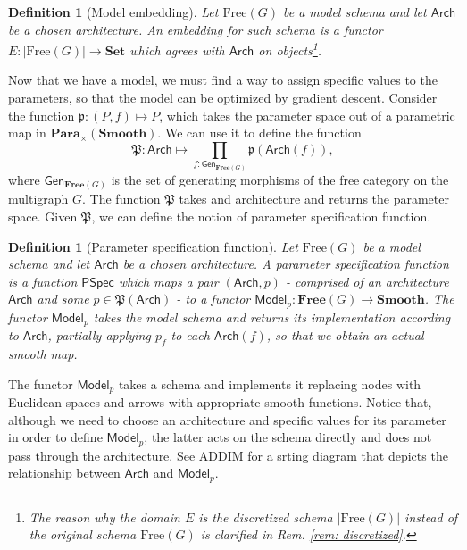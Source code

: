 \documentclass[11pt,a4paper,openright,twoside]{report}
\newcounter{mycounter}
\theoremstyle{plain}
\newtheorem{definition}[mycounter]{Definition}
\theoremstyle{definition}
\begin{document}
\begin{definition}[Model embedding]
  Let $\mathrm{Free}(G)$ be a model schema and let $\mathsf{Arch}$ be a chosen architecture. An embedding for such schema is a functor $E: |\mathrm{Free}(G)| \to \mathbf{Set}$ which agrees with $\mathsf{Arch}$ on objects\footnote{The reason why the domain $E$ is the discretized schema $|\mathrm{Free}(G)|$ instead of the original schema $\mathrm{Free}(G)$ is clarified in \textit{Rem. \ref{rem: discretized}}.}.
\end{definition}

Now that we have a model, we must find a way to assign specific values to the parameters, so that the model can be optimized by gradient descent. Consider the function $\mathfrak{p}: (P,f) \mapsto P$, which takes the parameter space out of a parametric map in $\mathbf{Para}_{\times}(\mathbf{Smooth})$. We can use it to define the function 
\[\mathfrak{P}: \mathsf{Arch} \mapsto \prod_{f : \mathsf{Gen}_{\mathbf{Free}(G)}}\mathfrak{p}(\mathsf{Arch}(f)),\]
where $\mathsf{Gen}_{\mathbf{Free}(G)}$ is the set of generating morphisms of the free category on the multigraph $G$. The function $\mathfrak{P}$ takes and architecture and returns the parameter space. Given $\mathfrak{P}$, we can define the notion of parameter specification function.

\begin{definition}[Parameter specification function]
  Let $\mathrm{Free}(G)$ be a model schema and let $\mathsf{Arch}$ be a chosen architecture. A parameter specification function is a function $\mathsf{PSpec}$ which maps a pair $(\mathsf{Arch}, p)$ - comprised of an architecture $\mathsf{Arch}$ and some $p \in \mathfrak{P}(\mathsf{Arch})$ - to a functor $\mathsf{Model}_p: \mathbf{Free}(G) \to \mathbf{Smooth}$. The functor $\mathsf{Model}_p$ takes the model schema and returns its implementation according to $\mathsf{Arch}$, partially applying $p_f$ to each $\mathsf{Arch}(f)$, so that we obtain an actual smooth map. 
\end{definition}

The functor $\mathsf{Model}_p$ takes a schema and implements it replacing nodes with Euclidean spaces and arrows with appropriate smooth functions. Notice that, although we need to choose an architecture and specific values for its parameter in order to define $\mathsf{Model}_p$, the latter acts on the schema directly and does not pass through the architecture. See ADDIM for a srting diagram that depicts the relationship between $\mathsf{Arch}$ and $\mathsf{Model}_p$.
\end{document}
